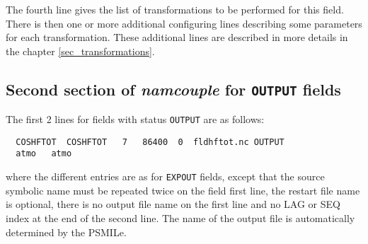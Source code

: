   The fourth line gives the list of transformations to be performed
  for this field. There is then one or more additional configuring lines
  describing some parameters for each transformation. These
  additional lines are described in more details in the chapter
  \ref{sec_transformations}.

%
%

\subsection{Second section of {\it namcouple} for {\tt OUTPUT} fields}
\label{subsubsec_secondOUTPUT}
  The first 2 lines for fields with status {\tt OUTPUT} are as follows:
  \begin{verbatim}
  COSHFTOT  COSHFTOT   7   86400  0  fldhftot.nc OUTPUT 
  atmo   atmo \end{verbatim}
where the different entries are as for {\tt EXPOUT} fields, except
that the source symbolic name must be repeated twice on the field
first line, the restart file name is optional, there is no output file
name on the first line and no LAG or  SEQ index at the end of the second line.
The name of the output file is automatically determined by the PSMILe.

